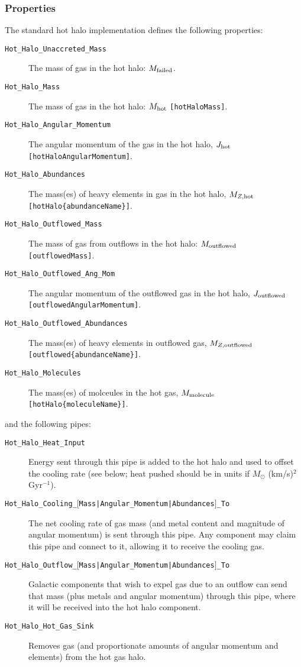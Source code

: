 \subsubsection{Properties}

The standard hot halo implementation defines the following properties:
\begin{description}
 \item [{\tt Hot\_Halo\_Unaccreted\_Mass}] The mass of gas in the hot halo: $M_{\rm failed}$.
 \item [{\tt Hot\_Halo\_Mass}] The mass of gas in the hot halo: $M_{\rm hot}$ {\tt [hotHaloMass]}.
 \item [{\tt Hot\_Halo\_Angular\_Momentum}] The angular momentum of the gas in the hot halo, $J_{\rm hot}$ {\tt [hotHaloAngularMomentum]}.
 \item [{\tt Hot\_Halo\_Abundances}] The mass(es) of heavy elements in gas in the hot halo, $M_{Z, {\rm hot}}$ {\tt [hotHalo\{abundanceName\}]}.
 \item [{\tt Hot\_Halo\_Outflowed\_Mass}] The mass of gas from outflows in the hot halo: $M_{\rm outflowed}$ {\tt [outflowedMass]}.
 \item [{\tt Hot\_Halo\_Outflowed\_Ang\_Mom}] The angular momentum of the outflowed gas in the hot halo, $J_{\rm outflowed}$ {\tt [outflowedAngularMomentum]}.
 \item [{\tt Hot\_Halo\_Outflowed\_Abundances}] The mass(es) of heavy elements in outflowed gas, $M_{Z, {\rm outflowed}}$ {\tt [outflowed\{abundanceName\}]}.
 \item [{\tt Hot\_Halo\_Molecules}] The mass(es) of molceules in the hot gas, $M_{\rm molecule}$ {\tt [hotHalo\{moleculeName\}]}.
\end{description}
and the following pipes:
\begin{description}
 \item [{\tt Hot\_Halo\_Heat\_Input}] Energy sent through this pipe is added to the hot halo and used to offset the cooling rate (see below; heat pushed should be in units if $M_\odot$ (km/s)$^2$ Gyr$^{-1}$).
 \item [{\tt Hot\_Halo\_Cooling\_$[$Mass|Angular\_Momentum|Abundances$]$\_To}] The net cooling rate of gas mass (and metal content and magnitude of angular momentum) is sent through this pipe. Any component may claim this pipe and connect to it, allowing it to receive the cooling gas.
 \item [{\tt Hot\_Halo\_Outflow\_$[$Mass|Angular\_Momentum|Abundances$]$\_To}] Galactic components that wish to expel gas due to an outflow can send that mass (plus metals and angular momentum) through this pipe, where it will be received into the hot halo component. 
 \item [{\tt Hot\_Halo\_Hot\_Gas\_Sink}] Removes gas (and proportionate amounts of angular momentum and elements) from the hot gas halo.
\end{description}

